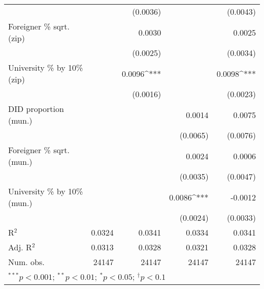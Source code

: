 \begin{tabular}{l D{.}{.}{5.7} D{.}{.}{5.7} D{.}{.}{5.7} D{.}{.}{5.7}}
                                  &              & (0.0036)     &              & (0.0043)     \\
Foreigner \% sqrt. (zip)          &              & 0.0030       &              & 0.0025       \\
                                  &              & (0.0025)     &              & (0.0034)     \\
University \% by 10\% (zip)       &              & 0.0096^{***} &              & 0.0098^{***} \\
                                  &              & (0.0016)     &              & (0.0023)     \\
DID proportion (mun.)             &              &              & 0.0014       & 0.0075       \\
                                  &              &              & (0.0065)     & (0.0076)     \\
Foreigner \% sqrt. (mun.)         &              &              & 0.0024       & 0.0006       \\
                                  &              &              & (0.0035)     & (0.0047)     \\
University \% by 10\% (mun.)      &              &              & 0.0086^{***} & -0.0012      \\
                                  &              &              & (0.0024)     & (0.0033)     \\
\midrule
R$^2$                             & 0.0324       & 0.0341       & 0.0334       & 0.0341       \\
Adj. R$^2$                        & 0.0313       & 0.0328       & 0.0321       & 0.0328       \\
Num. obs.                         & 24147        & 24147        & 24147        & 24147        \\
\bottomrule
{}
\end{tabular}
